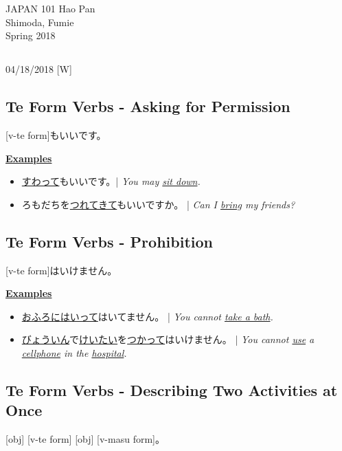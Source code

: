\documentclass{article}
\begin{document}
 \begin{CJK}{UTF8}{min}

\noindent
{JAPAN 101 \hfill Hao Pan}\\
{Shimoda, Fumie}\\
{Spring 2018}


\begin{center}
\section{}
\noindent
{\hfill 04/18/2018 [W]}
\end{center}

\subsection{Te Form Verbs - Asking for Permission}
[v-te form]もいいです。

\bigskip

\uline{\bf Examples}
\begin{itemize}
\item \uline{すわって}もいいです。| \emph{You may \uline{sit down}.}
\item ろもだちを\uline{つれてきて}もいいですか。 | \emph{Can I \uline{bring} my friends?}
\end{itemize}

\subsection{Te Form Verbs - Prohibition}
[v-te form]はいけません。

\bigskip

\uline{\bf Examples}
\begin{itemize}
\item \uline{おふろにはいって}はいてません。 | \emph{You cannot \uline{take a bath}.}
\item \uline{びょういん}で\uline{けいたい}を\uline{つかって}はいけません。 | \emph{You cannot \uline{use} a \uline{cellphone} in the \uline{hospital}.}
\end{itemize}

\subsection{Te Form Verbs - Describing Two Activities at Once}
[obj] [v-te form] [obj] [v-masu form]。


\end{CJK}
\end{document}
